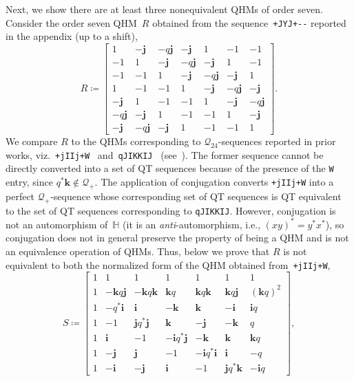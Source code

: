 \documentclass[12pt]{article}
\numberwithin{equation}{section}
\newcommand{\qi}{\mathbf{i}}
\newcommand{\qj}{\mathbf{j}}
\newcommand{\qk}{\mathbf{k}}
\newcommand{\HH}{\mathbb{H}}
\newcommand{\Q}{\mathcal{Q}}
\newcommand{\eqdef}{\coloneqq}
\begin{document}
Next, we show there are at least three nonequivalent QHMs of order seven. 
Consider the order seven QHM~$R$ obtained from the sequence~\verb|+JYJ+--| reported in the appendix (up to a shift), 
\begin{equation}
\label{eq-o7qhm}
R \eqdef
\begin{bmatrix}
 1 & -\qj & -q \qj & -\qj & 1 & -1 & -1 \\
-1 & 1 & -\qj & - q \qj & -\qj & 1 & -1 \\
-1 & -1 & 1 & -\qj & - q \qj & -\qj & 1 \\
 1 & -1 & -1 & 1 & -\qj & - q \qj & -\qj \\
-\qj & 1 & -1 & -1 & 1 & -\qj & - q \qj \\
- q \qj & -\qj & 1 & -1 & -1 & 1 & -\qj \\
-\qj & - q \qj & -\qj & 1 & -1 & -1 & 1 
\end{bmatrix} .
\end{equation}
We compare $R$ to the QHMs corresponding to $\Q_{24}$-sequences reported in prior works, viz.~\verb|+jIIj+W|~\cite[Example~7.3]{Kuznetsov2010} and~\verb|qJIKKIJ|~\cite{LS11-williamson-matrices} (see~\cite[Table~1]{BarreraAcevedo2024}).
The former sequence cannot be directly converted into a set of QT sequences because of the presence of the
\verb|W| entry, since $q^*\qk\notin\Q_+$.  The application of conjugation converts \verb|+jIIj+W| into a perfect $\Q_+$-sequence
whose corresponding set of QT sequences is QT equivalent to the set of QT sequences corresponding to \verb|qJIKKIJ|.
However, conjugation is not an automorphism of~$\HH$ (it is an \emph{anti}-automorphism, i.e., $(xy)^*=y^*x^*$), so conjugation does not in
general preserve the property of being a QHM and is not an equivalence operation of QHMs.
Thus, below we prove that $R$ is not equivalent
to both the normalized form of the QHM obtained from~\verb|+jIIj+W|,
\begin{equation}
\label{eq-o7qhm-k10}
S \eqdef
\begin{bmatrix}
1 & 1 & 1 & 1 & 1 & 1 & 1 \\
1 & -\qk q \qj & -\qk q \qk & \qk q & \qk q \qk & \qk q \qj & (\qk q)^2 \\
1 & -q^* \qi & \qi & -\qk & \qk & -\qi & \qi q \\
1 & -1 & \qj q^* \qj & \qk & -\qj & -\qk & q \\
1 & \qi & -1 & -\qi q^* \qj & -\qk & \qk & \qk q \\
1 & -\qj & \qj & -1 & -\qi q^* \qi & \qi & -q \\ 
1 & -\qi & -\qj & \qi & -1 & \qj q^* \qk & -\qi q 
\end{bmatrix} ,
\end{equation}
\end{document}
